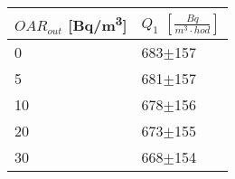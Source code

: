 \begin{tabular}{ll}
\toprule
$OAR_{out}$ [\si{Bq/m^3}] & $Q_1$ $\left[\si{\frac{Bq}{m^3\cdot hod}}\right]$ \\
\midrule
0  &                                         683$\pm$157 \\
5  &                                         681$\pm$157 \\
10 &                                         678$\pm$156 \\
20 &                                         673$\pm$155 \\
30 &                                         668$\pm$154 \\
\bottomrule
\end{tabular}
